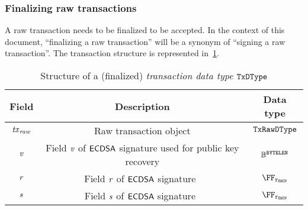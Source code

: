 \subsubsection{Finalizing raw transactions}\label{preliminaries:ethereum:eth-tx:final}
A raw transaction needs to be finalized to be accepted. In the context of this document, ``finalizing a raw transaction'' will be a synonym of ``signing a raw transaction''. The transaction structure is represented in~\cref{preliminaries:tab:eth-signed}.

\begin{table}[H]
    \centering
    \begin{tabular}{ccc}
        Field           & Description & Data type \\ \toprule
        $\mathit{\mathit{tx}_{raw}}$      & Raw transaction object & ${\mathtt{TxRawDType}}$ \\ \midrule
        $\mathit{v}$         & Field $\mathit{v}$ of $\mathsf{ECDSA}$ signature used for public key recovery & $\mathbb{B}^{\mathtt{BYTELEN}}$\\ \midrule
        $\mathit{r}$         & Field $\mathit{r}$ of $\mathsf{ECDSA}$ signature~\cite{rfc6979} & $\FFx{\rSecp}$\\ \midrule
        $\mathit{s}$         & Field $\mathit{s}$ of $\mathsf{ECDSA}$ signature~\cite{rfc6979} & $\FFx{\rSecp}$\\ \bottomrule
    \end{tabular}
    \caption{Structure of a (finalized) \emph{transaction data type} ${\mathtt{TxDType}}$}\label{preliminaries:tab:eth-signed}
\end{table}

